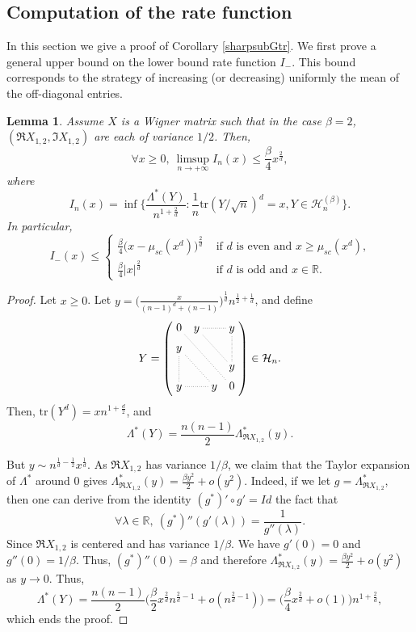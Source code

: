 \documentclass[aop,preprint]{imsart}
\newcommand\RR{\mathbb{R}}
\newcommand\tr{\mathrm{tr}}
\numberwithin{equation}{section}
\theoremstyle{definition}
\theoremstyle{plain}
\newtheorem{Lem}[Def]{Lemma}
\theoremstyle{remark}
\begin{document}
\subsection{Computation of the rate function}\label{comp}
In this section we give a proof of Corollary \ref{sharpsubGtr}. We first prove a general upper bound on the lower bound rate function $I_-$. This bound corresponds to the strategy of increasing (or decreasing) uniformly the mean of the off-diagonal entries.
\begin{Lem}\label{upperboundrate}
Assume $X$ is a Wigner matrix such that in the case $\beta=2$, $(\Re X_{1,2}, \Im X_{1,2})$ are each of variance $1/2$. Then,
$$ \forall x\geq 0, \ \limsup_{n\to +\infty} I_n(x) \leq \frac{\beta}{4} x^{\frac{2}{d}},$$
where
$$ I_n(x) = \inf \big\{ \frac{\Lambda^*(Y)}{n^{1+\frac{2}{d}}} : \frac{1}{n} \tr(Y/\sqrt{n})^d  =x , Y \in\mathcal{H}_n^{(\beta)}\big\}.$$ 
 In particular,
$$  I_-(x) \leq  \begin{cases}
\frac{\beta}{4} \big( x-\mu_{sc}(x^d)\big)^{\frac{2}{d}} & \text{ if $d$ is even and $x \geq \mu_{sc}(x^d)$,}\\
 \frac{\beta}{4} |x|^{\frac{2}{d}}& \text{ if $d$ is odd and $x\in \RR$}.
\end{cases}$$
\end{Lem}
\begin{proof}Let $x\geq 0$. 
Let  $y = \Big( \frac{x}{(n-1)^d+(n-1)} \Big)^{\frac{1}{d}} n^{\frac{1}{2} + \frac{1}{d}}$, and define \begin{equation*}
Y
= \left(
     \raisebox{0.5\depth}{%
       \xymatrixcolsep{1ex}%
       \xymatrixrowsep{1ex}%
       \xymatrix{
        0 \ar @{.}[dddrrr]& y \ar @{.}[rr] \ar @{.}[ddrr] &   &y \ar @{.}[dd]  \\
         y \ar@{.}[dd] \ar@{.}[ddrr] & & & \\
         &&&y \\
         y \ar@{.}[rr] &  &y& 0
       }%
     }
   \right)\in  \mathcal{H}_n. \end{equation*}
Then, $\tr (Y^d) =xn^{1+\frac{d}{2}}$, and
$$ \Lambda^*(Y) = \frac{n(n-1)}{2} \Lambda^*_{\Re X_{1,2}}(y).$$

But $y \sim n^{\frac{1}{d}-\frac{1}{2}} x^{\frac{1}{d}}$. As $\Re X_{1,2}$ has variance $1/\beta$, we claim that the Taylor expansion of $\Lambda^*$ around $0$ gives $\Lambda^*_{\Re X_{1,2}} (y) = \frac{\beta y^2}{2} + o(y^2)$. Indeed, if we let $ g = \Lambda^*_{\Re X_{1,2}}$, then one can derive from the identity $ (g^*)' \circ g' =Id$ the fact that
$$\forall \lambda \in \RR, \   (g^*)''( g' (\lambda )) = \frac{1}{g''(\lambda)}.$$
Since $\Re X_{1,2}$ is centered and has variance $1/\beta$. We have $g'(0) = 0$ and $g''(0) =1/\beta$. Thus, $(g^*)''(0)=\beta$ and therefore $\Lambda^*_{\Re X_{1,2}} (y) = \frac{\beta y^2}{2} + o(y^2)$ as $y \to0$. Thus,
$$ \Lambda^*(Y) = \frac{n(n-1)}{2}\Big( \frac{\beta}
{2} x^{\frac{2}{d}}n^{\frac{2}{d}-1} + o(n^{\frac{2}{d}-1})\Big) = \big(\frac{\beta}{4} x^{\frac{2}{d}} + o(1)\big) n^{1+\frac{2}{d}},$$
which ends the proof.
\end{proof}
\end{document}
